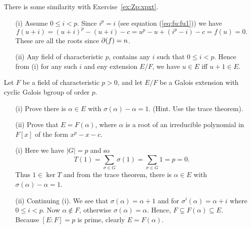 \begin{myenumerate}
There is some similarity with Exercise~\ref{ex:Zp:xpxt}.

\begin{itemize}
 \item[(i)]
   Assume \(0\leq i < p\). Since \(i^p = i\) (see equation (\ref{eq:fu:fu1}))
   we have
   \begin{equation*}
   f(u+i) = (u+i)^p - (u+i) - c = u^p - u + (i^p - i) - c = f(u) = 0.
   \end{equation*}
   These are all the roots since \(\partial(f) = n\).
 \item[(ii)]
   Any field of characteristic $p$, contains any $i$ such that \(0\leq i < p\).
   Hence from (i) for any such $i$ and eny extension \(E/F\),
   we have \(u \in E\) iff \(u+1 \in E\).
\end{itemize}

\item
\begin{excopy}
Let $F$ be a field of characteristic \(p>0\), and let \(E/F\) be a
Galois extension with cyclic Galois bgroup \lrangle{\sigma} of order $p$.

\begin{itemize}
 \item[(i)]
   Prove there is \(\alpha \in E\) with \(\sigma(\alpha) - \alpha = 1\).
   (Hint. Use the trace theorem).
 \item[(ii)]
   Prove that \(E=F(\alpha)\), where \(\alpha\)
   is a root of an irreducible polynomial in \(F[x]\)
   of the form \(x^p - x - c\).
\end{itemize}
\end{excopy}

\begin{itemize}
 \item[(i)]
   Here we have \(|G|=p\) and so
   \begin{equation*}
   T(1) = \sum_{\sigma \in G} \sigma(1)  = \sum_{\sigma \in G} 1 = p = 0.
   \end{equation*}
   Thus \(1\in \ker T\) and from the trace theorem, there is
   \(\alpha \in E\) with \(\sigma(\alpha) - \alpha = 1\).

 \item[(ii)]
   Continuing (i). We see that \(\sigma(\alpha) = \alpha + 1\)
   and for \(\sigma^i(\alpha) = \alpha + i\) where \(0\leq i < p\).
   Now \(\alpha\notin F\), otherwise \(\sigma(\alpha) = \alpha\).
   Hence, \(F\subsetneq F(\alpha) \subseteq E\). Because \([E:F]=p\) is prime,
   clearly \(E=F(\alpha)\).


\end{itemize}
\end{myenumerate}
